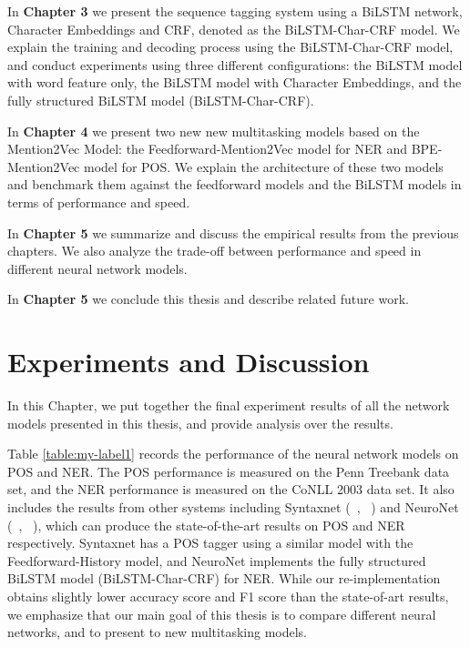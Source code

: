 \documentclass{sfuthesis}
\begin{document}
In \textbf{Chapter 3} we present the sequence tagging system using a BiLSTM network, Character Embeddings and CRF, denoted as the BiLSTM-Char-CRF model. We explain the training and decoding process using the BiLSTM-Char-CRF model, and conduct experiments using three different configurations: the BiLSTM model with word feature only, the BiLSTM model with Character Embeddings, and the fully structured BiLSTM model (BiLSTM-Char-CRF).

In \textbf{Chapter 4} we present two new new multitasking models based on the Mention2Vec Model: the Feedforward-Mention2Vec model for NER and BPE-Mention2Vec model for POS. We explain the architecture of these two models and benchmark them against the feedforward models and the BiLSTM models in terms of performance and speed.

In \textbf{Chapter 5} we summarize and discuss the empirical results from the previous chapters. We also analyze the trade-off between performance and speed in different neural network models.

In \textbf{Chapter 5} we conclude this thesis and describe related future work.









\chapter{Experiments and Discussion}

In this Chapter, we put together the final experiment results of all the network models presented in this thesis, and provide analysis over the results.

Table \ref{table:my-label1} records the performance of the neural network models on POS and NER. The POS performance is measured on the Penn Treebank data set, and the NER performance is measured on the CoNLL 2003 data set. It also includes the results from other systems including Syntaxnet (~\citeauthor{alberti2017syntaxnet}, ~\citeyear{alberti2017syntaxnet}) and NeuroNet (~\citeauthor{2017neuroner}, ~\citeyear{2017neuroner}), which can produce the state-of-the-art results on POS and NER respectively. Syntaxnet has a POS tagger using a similar model with the Feedforward-History model, and NeuroNet implements the fully structured BiLSTM model (BiLSTM-Char-CRF) for NER. While our re-implementation obtains slightly lower accuracy score and F1 score than the state-of-art results, we emphasize that our main goal of this thesis is to compare different neural networks, and to present to new multitasking models.
\end{document}
